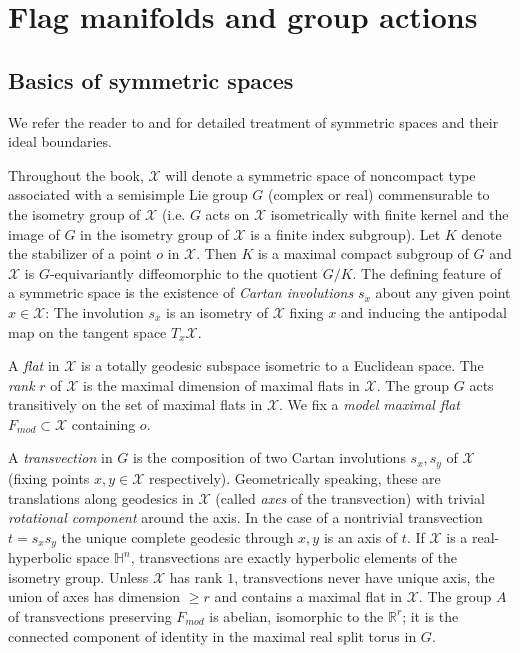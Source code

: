 \documentclass[12pt]{amsbook}%
\theoremstyle{definition}
\theoremstyle{remark}
\numberwithin{section}{chapter}
\numberwithin{subsection}{section}
\numberwithin{figure}{chapter}
\def\Fmod{F_{mod}}
\def\bR{{\mathbb{R}}}
\def\bH{{\mathbb{H}}}
\def\cX{{\mathscr{X}}}
\def\kap{}
\begin{document}
{{\chapter{Flag manifolds and group actions}
\label{section_prelim}

\section{Basics of symmetric spaces}


We refer the reader to \cite{BGS} and \cite{Eberlein} for detailed treatment of symmetric spaces and their ideal boundaries. 

\medskip \index{$\cX$, a symmetric space}
Throughout the book, $\cX$ will denote a symmetric space of noncompact type associated with a semisimple Lie group $G$ (complex or real) 
commensurable to the isometry group of $\cX$ (i.e. $G$ acts on $\cX$ isometrically with finite kernel and the image of $G$ in the isometry group of $\cX$ is a finite index subgroup). Let $K$ denote the stabilizer of a point $o$ in $\cX$. Then $K$ is a maximal compact subgroup of $G$ and $\cX$ is $G$-equivariantly diffeomorphic to the quotient $G/K$. The defining feature of a symmetric space is the existence of {\em Cartan involutions} $s_x$ about any given point $x\in \cX$: The involution 
$s_x$ is an isometry of $\cX$ fixing $x$ and inducing the antipodal map on the tangent space $T_x\cX$. 


 
A {\em flat} in $\cX$ is a totally geodesic subspace  isometric to a Euclidean space. The {\em rank} $r$ of $\cX$ is the maximal dimension of  maximal flats in $\cX$. The group $G$ acts transitively on the set of maximal flats in $\cX$. We fix a   {\em model maximal flat} $\Fmod\subset \cX$ containing $o$. \index{$\Fmod$, 
model maximal flat}


A {\em transvection} in $G$ is the composition of two Cartan involutions $s_x, s_y$ of $\cX$ (fixing points $x, y\in \cX$ respectively). 
Geometrically speaking, these are translations along geodesics in $\cX$ 
(called {\em axes} of the transvection) with trivial {\em rotational component} around the axis. In the case of a nontrivial transvection  
$t=s_xs_y$ the unique complete geodesic through $x, y$ is an axis of $t$. If  
$\cX$ is a real-hyperbolic space $\bH^n$, transvections are exactly hyperbolic elements of the isometry group. Unless $\cX$ has rank $1$, transvections never have 
unique axis, the union of axes has dimension $\geqslant r$ and contains a maximal flat in $\cX$.   
The group  $A$ of transvections preserving $\Fmod$ 
is abelian, isomorphic to the $\bR^r$; it is the connected component of identity in the maximal real split torus in $G$. 



}}
\end{document}
